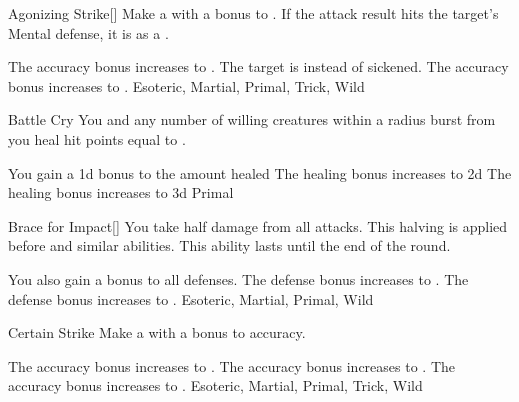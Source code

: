 
\lowercase{\hypertarget{maneuver:Agonizing Strike}{}}\label{maneuver:Agonizing Strike}
\hypertarget{maneuver:Agonizing Strike}{}
\begin{apability}{Agonizing Strike}[]
Make a  with a  bonus to .
If the attack result hits the target's Mental defense,
it is  as a .

\rankline
{} The accuracy bonus increases to .
 The target is  instead of sickened.
 The accuracy bonus increases to .
 Esoteric, Martial, Primal, Trick, Wild
\end{apability}
\vspace{0.25em}



\lowercase{\hypertarget{maneuver:Battle Cry}{}}\label{maneuver:Battle Cry}
\hypertarget{maneuver:Battle Cry}{}
\begin{apability}{Battle Cry}
You and any number of willing creatures within a \arealarge radius burst from you
heal hit points equal to .

\rankline
{} You gain a \plus1d bonus to the amount healed
 The healing bonus increases to \plus2d
 The healing bonus increases to \plus3d
 Primal
\end{apability}
\vspace{0.25em}



\lowercase{\hypertarget{maneuver:Brace for Impact}{}}\label{maneuver:Brace for Impact}
\hypertarget{maneuver:Brace for Impact}{}
\begin{freeability}{Brace for Impact}[]
You take half damage from all attacks.
This halving is applied before  and similar abilities.
This ability lasts until the end of the round.

\rankline
{} You also gain a  bonus to all defenses.
 The defense bonus increases to .
 The defense bonus increases to .
 Esoteric, Martial, Primal, Wild
\end{freeability}
\vspace{0.25em}



\lowercase{\hypertarget{maneuver:Certain Strike}{}}\label{maneuver:Certain Strike}
\hypertarget{maneuver:Certain Strike}{}
\begin{apability}{Certain Strike}
Make a  with a  bonus to accuracy.

\rankline
{} The accuracy bonus increases to .
 The accuracy bonus increases to .
 The accuracy bonus increases to .
 Esoteric, Martial, Primal, Trick, Wild
\end{apability}
\vspace{0.25em}



